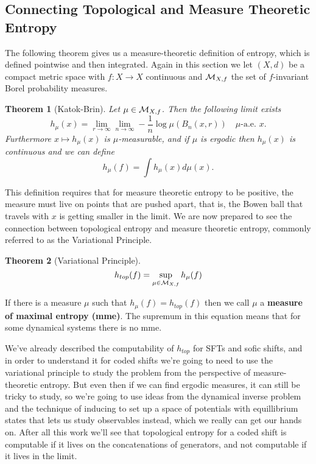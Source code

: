 \documentclass[11pt, reqno]{amsart}
\theoremstyle{plain}
\newtheorem{thm}{Theorem}[section]
\numberwithin{thm}{subsection}
\theoremstyle{definition}
\begin{document}
\subsection{Connecting Topological and Measure Theoretic Entropy}\cite[L10, L11]{wolf}
The following theorem gives us a measure-theoretic definition of entropy, which is defined pointwise and then integrated. Again in this section we let $(X,d)$ be a compact metric space with $f: X \rightarrow X$ continuous and $\mathcal{M}_{X,f}$ the set of $f$-invariant Borel probability measures. 
\begin{thm}[Katok-Brin]
  Let $\mu \in \mathcal{M}_{X,f}$. Then the following limit exists 
  $$h_\mu(x) = \lim_{r \rightarrow \infty} \lim_{n \rightarrow \infty} - \frac{1}{n} \log \mu(B_n(x, r)) \quad \mu\text{-a.e. } x.$$
  Furthermore $x \mapsto h_\mu(x)$ is $\mu$-measurable, and if $\mu$ is ergodic then $h_\mu(x)$ is continuous and we can define 
  $$h_\mu(f) = \int h_\mu(x)d\mu(x).$$
\end{thm}
This definition requires that for measure theoretic entropy to be positive, the measure must live on points that are pushed apart, that is, the Bowen ball that travels with $x$ is getting smaller in the limit. We are now prepared to see the connection between topological entropy and measure theoretic entropy, commonly referred to as the Variational Principle.

\begin{thm}[Variational Principle]
  $$h_{top}(f)= \sup_{\mu \in \mathcal{M}_{X,f}}h_\mu(f)$$
\end{thm}

If there is a measure $\mu$ such that $h_\mu(f) = h_{top}(f)$ then we call $\mu$ a \textbf{measure of maximal entropy (mme)}. The supremum in this equation means that for some dynamical systems there is no mme. 

We've already described the computability of $h_{top}$ for SFTs and sofic shifts, and in order to understand it for coded shifts we're going to need to use the variational principle to study the problem from the perspective of measure-theoretic entropy. But even then if we can find ergodic measures, it can still be tricky to study, so we're going to use ideas from the dynamical inverse problem and the technique of inducing to set up a space of potentials with equillibrium states that lets us study observables instead, which we really can get our hands on. After all this work we'll see that topological entropy for a coded shift is computable if it lives on the concatenations of generators, and not computable if it lives in the limit.
\end{document}
